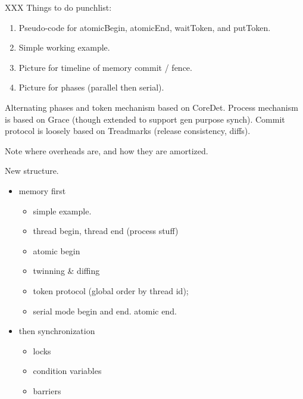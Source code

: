 
XXX Things to do punchlist:

\begin{enumerate}
\item Pseudo-code for atomicBegin, atomicEnd, waitToken, and putToken.
\item Simple working example.
\item Picture for timeline of memory commit / fence.
\item Picture for phases (parallel then serial).
\end{enumerate}

Alternating phases and token mechanism based on CoreDet.
Process mechanism is based on Grace (though extended to support gen purpose synch).
Commit protocol is loosely based on Treadmarks (release consistency, diffs).

Note where overheads are, and how they are amortized.

New structure.
\begin{itemize}
\item memory first
\begin{itemize}
\item   simple example.
\item   thread begin, thread end (process stuff)
\item   atomic begin
\item   twinning \& diffing
\item   token protocol (global order by thread id);
\item serial mode begin and end. atomic end.
\end{itemize}
\item then synchronization
\begin{itemize}
\item   locks
\item   condition variables
\item   barriers
\end{itemize}
\end{itemize}
